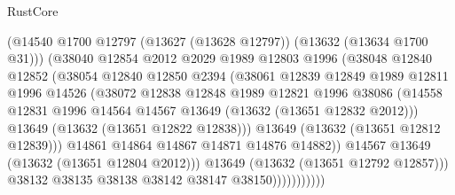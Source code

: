 \begin{lexlean}{RustCore}
\begin{coremodule}
                            (@14540
                              @1700
                              @12797
                              (@13627 (@13628 @12797))
                              (@13632 (@13634 @1700 @31)))
                            (@38040
                              @12854
                              @2012
                              @2029
                              @1989
                              @12803
                              @1996
                              (@38048
                                @12840
                                @12852
                                (@38054
                                  @12840
                                  @12850
                                  @2394
                                  (@38061
                                    @12839
                                    @12849
                                    @1989
                                    @12811
                                    @1996
                                    @14526
                                    (@38072
                                      @12838
                                      @12848
                                      @1989
                                      @12821
                                      @1996
                                      @38086
                                      (@14558
                                        @12831
                                        @1996
                                        @14564
                                        @14567
                                        @13649
                                        (@13632 (@13651 @12832 @2012)))
                                      @13649
                                      (@13632 (@13651 @12822 @12838)))
                                    @13649
                                    (@13632 (@13651 @12812 @12839)))
                                  @14861
                                  @14864
                                  @14867
                                  @14871
                                  @14876
                                  @14882))
                              @14567
                              @13649
                              (@13632 (@13651 @12804 @2012)))
                            @13649
                            (@13632 (@13651 @12792 @12857)))
                          @38132
                          @38135
                          @38138
                          @38142
                          @38147
                          @38150)))))))))))

\end{coremodule}
\end{lexlean}
